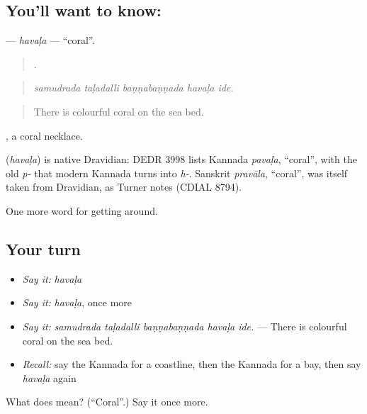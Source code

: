 \subsection*{You'll want to know: }
\textbf{} — \emph{havaḷa} — \textquotedblleft{}coral\textquotedblright{}.

\begin{quote}
    .
\end{quote}

\begin{quote}
\emph{samudrada taḷadalli baṇṇabaṇṇada havaḷa ide.}
\end{quote}

\begin{quote}
There is colourful coral on the sea bed.
\end{quote}

 , a coral necklace.

\begin{cousinweb}
\textbf{} (\emph{havaḷa}) is native Dravidian: DEDR 3998 lists Kannada \emph{pavaḷa}, \textquotedblleft{}coral\textquotedblright{}, with the old \emph{p-} that modern Kannada turns into \emph{h-}. Sanskrit \emph{pravāla}, \textquotedblleft{}coral\textquotedblright{}, was itself taken from Dravidian, as Turner notes (CDIAL 8794).
\end{cousinweb}

\begin{grammarlens}[title={What you've built}]
One more word for getting around.
\end{grammarlens}

\subsection*{Your turn}
\begin{itemize}
\raggedright
  \item \emph{Say it:} \emph{havaḷa}
  \item \emph{Say it:} \emph{havaḷa}, once more
  \item \emph{Say it:} \emph{samudrada taḷadalli baṇṇabaṇṇada havaḷa ide.} — There is colourful coral on the sea bed.
  \item \emph{Recall:} say the Kannada for a coastline, then the Kannada for a bay, then say \emph{havaḷa} again
\end{itemize}

\begin{tcolorbox}[breakable,colback=teal!4,colframe=teal!35!black,title={Before you move on}]
What does  mean? (\textquotedblleft{}Coral\textquotedblright{}.) Say it once more.
\end{tcolorbox}

